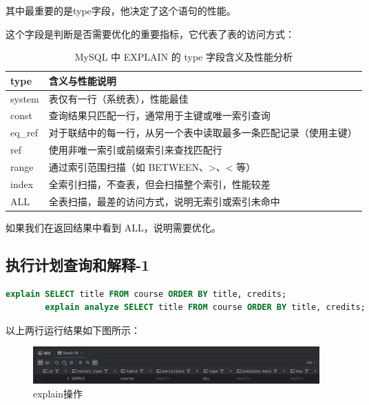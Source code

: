 \documentclass{article}
\begin{document}
	其中最重要的是type字段，他决定了这个语句的性能。
	
	这个字段是判断是否需要优化的重要指标，它代表了表的访问方式：
	
	\begin{table}[H]
		\centering
		\begin{tabular}{|l|p{10cm}|}
			\hline
			\textbf{type} & \textbf{含义与性能说明} \\
			\hline
			system & 表仅有一行（系统表），性能最佳 \\
			\hline
			const & 查询结果只匹配一行，通常用于主键或唯一索引查询 \\
			\hline
			eq\_ref & 对于联结中的每一行，从另一个表中读取最多一条匹配记录（使用主键） \\
			\hline
			ref & 使用非唯一索引或前缀索引来查找匹配行 \\
			\hline
			range & 通过索引范围扫描（如 BETWEEN、>、< 等） \\
			\hline
			index & 全索引扫描，不查表，但会扫描整个索引，性能较差 \\
			\hline
			ALL & 全表扫描，最差的访问方式，说明无索引或索引未命中 \\
			\hline
		\end{tabular}
		\caption{MySQL 中 EXPLAIN 的 type 字段含义及性能分析}
	\end{table}
	
	如果我们在返回结果中看到 ALL，说明需要优化。
	
	\subsection{执行计划查询和解释-1}
	
	\begin{lstlisting}[language=sql, title=执行以下语句，获取并解释该查询执行计划, tabsize=4]
		explain SELECT title FROM course ORDER BY title, credits;
		explain analyze SELECT title FROM course ORDER BY title, credits;
	\end{lstlisting}
	
	以上两行运行结果如下图所示：
	
	\begin{figure}[H]
		\centering
		\includegraphics[width=11cm]{./images/2.解释操作1.png}
		\caption{explain操作}
	\end{figure}
	
\end{document}
